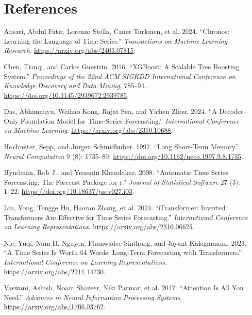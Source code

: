 \section*{References}\label{references}

\protect{}\label{refs}
\begin{CSLReferences}{1}{1}
Ansari, Abdul Fatir, Lorenzo Stella, Caner Turkmen, et al. 2024.
{``Chronos: Learning the Language of Time Series.''} \emph{Transactions
on Machine Learning Research}. \url{https://arxiv.org/abs/2403.07815}.

Chen, Tianqi, and Carlos Guestrin. 2016. {``XGBoost: A Scalable Tree
Boosting System.''} \emph{Proceedings of the 22nd ACM SIGKDD
International Conference on Knowledge Discovery and Data Mining},
785--94. \url{https://doi.org/10.1145/2939672.2939785}.

Das, Abhimanyu, Weihao Kong, Rajat Sen, and Yichen Zhou. 2024. {``A
Decoder-Only Foundation Model for Time-Series Forecasting.''}
\emph{International Conference on Machine Learning}.
\url{https://arxiv.org/abs/2310.10688}.

Hochreiter, Sepp, and Jürgen Schmidhuber. 1997. {``Long Short-Term
Memory.''} \emph{Neural Computation} 9 (8): 1735--80.
\url{https://doi.org/10.1162/neco.1997.9.8.1735}.

Hyndman, Rob J., and Yeasmin Khandakar. 2008. {``Automatic Time Series
Forecasting: The Forecast Package for r.''} \emph{Journal of Statistical
Software} 27 (3): 1--22. \url{https://doi.org/10.18637/jss.v027.i03}.

Liu, Yong, Tengge Hu, Haoran Zhang, et al. 2024. {``iTransformer:
Inverted Transformers Are Effective for Time Series Forecasting.''}
\emph{International Conference on Learning Representations}.
\url{https://arxiv.org/abs/2310.06625}.

Nie, Yuqi, Nam H. Nguyen, Phanwadee Sinthong, and Jayant Kalagnanam.
2023. {``A Time Series Is Worth 64 Words: Long-Term Forecasting with
Transformers.''} \emph{International Conference on Learning
Representations}. \url{https://arxiv.org/abs/2211.14730}.

Vaswani, Ashish, Noam Shazeer, Niki Parmar, et al. 2017. {``Attention Is
All You Need.''} \emph{Advances in Neural Information Processing
Systems}. \url{https://arxiv.org/abs/1706.03762}.


\end{CSLReferences}
